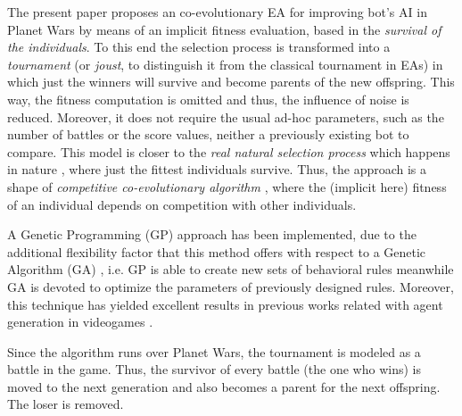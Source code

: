 \documentclass[conference]{IEEEtran}
\begin{document}

The present paper proposes an co-evolutionary EA \cite{Paredis_CEA} for improving bot's AI in Planet Wars by means of an implicit fitness evaluation,
based in the \textit{survival of the individuals}.
To this end the selection process is transformed into a \textit{tournament} (or \textit{joust}, to distinguish it from the classical tournament in EAs) in which just the winners will survive and become parents of the new offspring. This way, the fitness computation is omitted and thus, the influence of noise is reduced.  Moreover, it does not require the usual ad-hoc parameters, such as the number of battles or the score values, neither a previously existing bot to compare.
This model is closer to the \textit{real natural selection process} which happens in nature \cite{darwin1859}, where just the fittest individuals survive.
Thus, the approach is a shape of \textit{competitive co-evolutionary algorithm} \cite{Rosin_competitive_coevolution}, where the (implicit here) fitness of an individual depends on competition with other individuals.

A Genetic Programming (GP) \cite{GP_Koza92} approach has been implemented, due to the additional flexibility factor that this method offers with respect to a Genetic Algorithm (GA) \cite{GAs_Goldberg89}, i.e. GP is able to create new sets of behavioral rules meanwhile GA is devoted to optimize the parameters of previously designed rules. Moreover, this technique has yielded excellent results in previous works related with agent generation in videogames \cite{GarciaGP14,EsparciaGP2013}.


Since the algorithm runs over Planet Wars, the tournament is modeled as a battle in the game. %
Thus, the survivor of every battle (the one who wins)
is moved to the next generation and also becomes a parent for the next
offspring. The loser is removed.
\end{document}
